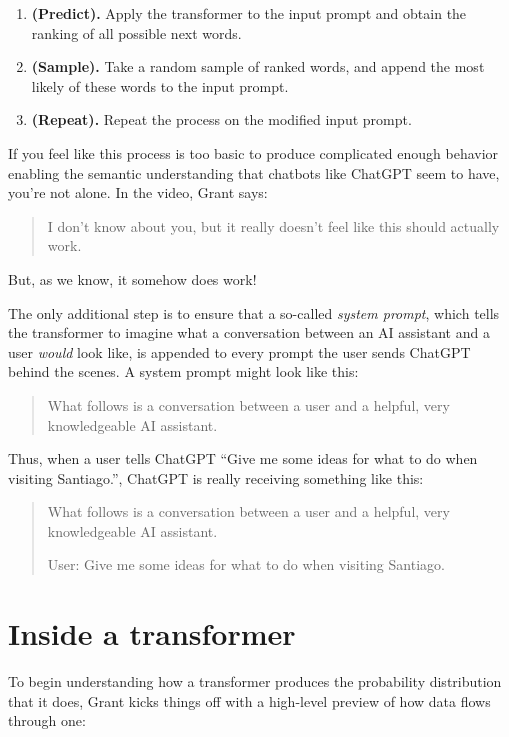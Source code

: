 \documentclass{article}
\begin{document}
\begin{enumerate}
	\item \textbf{(Predict).} Apply the transformer to the input prompt and obtain the ranking of all possible next words.
	\item \textbf{(Sample).} Take a random sample of ranked words, and append the most likely of these words to the input prompt.
	\item \textbf{(Repeat).} Repeat the process on the modified input prompt.
\end{enumerate}

If you feel like this process is too basic to produce complicated enough behavior enabling the semantic understanding that chatbots like ChatGPT seem to have, you're not alone. In the video, Grant says:

\begin{quote}
I don't know about you, but it really doesn't feel like this should actually work.
\end{quote}

But, as we know, it somehow does work!

The only additional step is to ensure that a so-called \textit{system prompt}, which tells the transformer to imagine what a conversation between an AI assistant and a user \textit{would} look like, is appended to every prompt the user sends ChatGPT behind the scenes. A system prompt might look like this:

\begin{quote}
What follows is a conversation between a user and a helpful, very knowledgeable AI assistant.
\end{quote}

Thus, when a user tells ChatGPT ``Give me some ideas for what to do when visiting Santiago.'', ChatGPT is really receiving something like this:

\begin{quote}
What follows is a conversation between a user and a helpful, very knowledgeable AI assistant.

User: Give me some ideas for what to do when visiting Santiago.
\end{quote}

\section*{Inside a transformer}

To begin understanding how a transformer produces the probability distribution that it does, Grant kicks things off with a high-level preview of how data flows through one:
\end{document}
